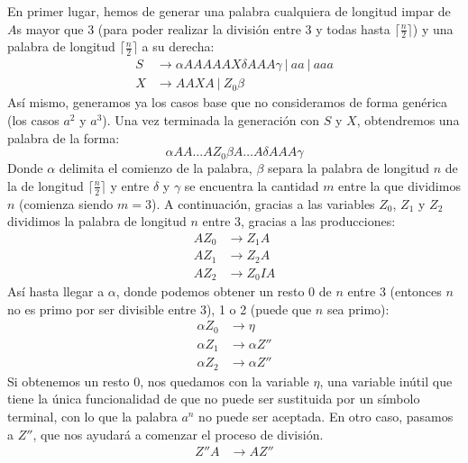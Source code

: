 \begin{ejercicio}
\begin{enumerate}
        En primer lugar, hemos de generar una palabra cualquiera de longitud impar de $A$s mayor que 3 (para poder realizar la división entre 3 y todas hasta $\lceil \frac{n}{2}\rceil$) y una palabra de longitud $\lceil \frac{n}{2}\rceil$ a su derecha:
        \begin{align*}
            S &\rightarrow \alpha AAAAA X \delta AAA \gamma\ |\ aa\ |\ aaa \\
            X &\rightarrow AAXA\ |\ Z_0 \beta
        \end{align*}
        Así mismo, generamos ya los casos base que no consideramos de forma genérica (los casos $a^2$ y $a^3$). Una vez terminada la generación con $S$ y $X$, obtendremos una palabra de la forma:
        \begin{equation*}
            \alpha AA\ldots A Z_0 \beta A \ldots A \delta AAA \gamma
        \end{equation*}
        Donde $\alpha$ delimita el comienzo de la palabra, $\beta$ separa la palabra de longitud $n$ de la de longitud $\lceil \frac{n}{2}\rceil$ y entre $\delta$ y $\gamma$ se encuentra la cantidad $m$ entre la que dividimos $n$ (comienza siendo $m=3$). A continuación, gracias a las variables $Z_0$, $Z_1$ y $Z_2$ dividimos la palabra de longitud $n$ entre 3, gracias a las producciones:
        \begin{align*}
            AZ_0 &\rightarrow Z_1A \\
            AZ_1 &\rightarrow Z_2A \\
            AZ_2 &\rightarrow Z_0IA 
        \end{align*}
        Así hasta llegar a $\alpha$, donde podemos obtener un resto 0 de $n$ entre 3 (entonces $n$ no es primo por ser divisible entre 3), 1 o 2 (puede que $n$ sea primo):
        \begin{align*}
            \alpha Z_0 &\rightarrow \eta \\
            \alpha Z_1 &\rightarrow \alpha Z'' \\
            \alpha Z_2 &\rightarrow \alpha Z'' 
        \end{align*}
        Si obtenemos un resto 0, nos quedamos con la variable $\eta$, una variable inútil que tiene la única funcionalidad de que no puede ser sustituida por un símbolo terminal, con lo que la palabra $a^n$ no puede ser aceptada. En otro caso, pasamos a $Z''$, que nos ayudará a comenzar el proceso de división.
        \begin{align*}
            Z''A &\rightarrow AZ'' \\

\end{align*}
\end{enumerate}
\end{ejercicio}
